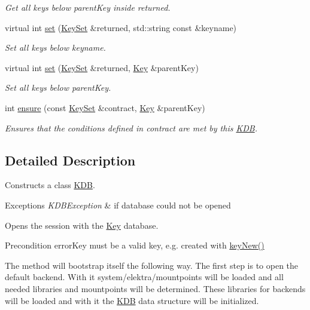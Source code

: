 \begin{DoxyCompactItemize}
\begin{DoxyCompactList}\small\item\em Get all keys below parent\+Key inside returned. \end{DoxyCompactList}\item 
virtual int \hyperlink{classkdb_1_1KDB_a29087a6a1a7de334f4e5b62ffe5d6e6e}{set} (\hyperlink{classkdb_1_1KeySet}{Key\+Set} \&returned, std\+::string const \&keyname)
\begin{DoxyCompactList}\small\item\em Set all keys below keyname. \end{DoxyCompactList}\item 
virtual int \hyperlink{classkdb_1_1KDB_a62a4fafbe21d9519b31a7868aa05f3e3}{set} (\hyperlink{classkdb_1_1KeySet}{Key\+Set} \&returned, \hyperlink{classkdb_1_1Key}{Key} \&parent\+Key)
\begin{DoxyCompactList}\small\item\em Set all keys below parent\+Key. \end{DoxyCompactList}\item 
int \hyperlink{classkdb_1_1KDB_a1e2a35e42941b9fee756e528a3ef14b6}{ensure} (const \hyperlink{classkdb_1_1KeySet}{Key\+Set} \&contract, \hyperlink{classkdb_1_1Key}{Key} \&parent\+Key)
\begin{DoxyCompactList}\small\item\em Ensures that the conditions defined in {\ttfamily contract} are met by this \hyperlink{classkdb_1_1KDB}{K\+DB}. \end{DoxyCompactList}\end{DoxyCompactItemize}


\subsection{Detailed Description}
Constructs a class \hyperlink{classkdb_1_1KDB}{K\+DB}. 


\begin{DoxyExceptions}{Exceptions}
{\em K\+D\+B\+Exception} & if database could not be opened\\
\hline
\end{DoxyExceptions}
Opens the session with the \hyperlink{classkdb_1_1Key}{Key} database. \begin{DoxyPrecond}{Precondition}
error\+Key must be a valid key, e.\+g. created with \hyperlink{group__key_gad23c65b44bf48d773759e1f9a4d43b89}{key\+New()}
\end{DoxyPrecond}
The method will bootstrap itself the following way. The first step is to open the default backend. With it system/elektra/mountpoints will be loaded and all needed libraries and mountpoints will be determined. These libraries for backends will be loaded and with it the {\ttfamily \hyperlink{classkdb_1_1KDB}{K\+DB}} data structure will be initialized.

